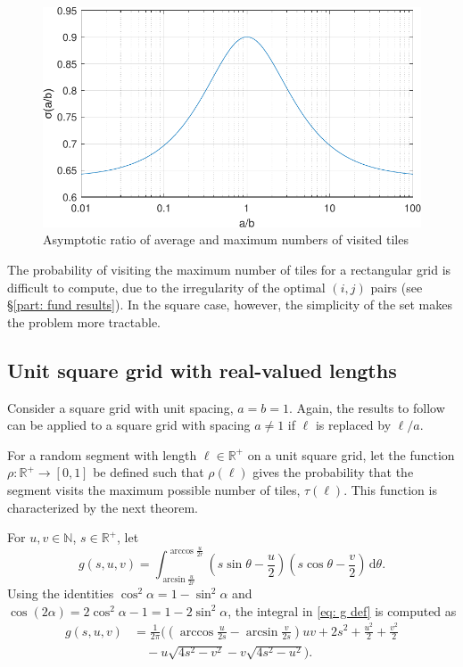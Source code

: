 \documentclass[12pt, a4paper]{article}
\newcommand{\diff}{\,\mathrm d}
\newcommand{\funt}{\tau} %
\newcommand{\probmax}{\rho} %
\newcommand{\len}{\ell} %
\newcommand{\genvar}{s}
\begin{document}
\begin{figure}
\centering%
\includegraphics[width=.7\textwidth]{ratio_asympt_slopes}%
\caption{Asymptotic ratio of average and maximum numbers of visited tiles
}%
\label{fig: ratio asympt slopes}%
\end{figure}%

The probability of visiting the maximum number of tiles for a rectangular grid is difficult to compute, due to the irregularity of the optimal $(i,j)$ pairs (see \S\ref{part: fund results}). In the square case, however, the simplicity of the set makes the problem more tractable. 


\subsection{Unit square grid with real-valued lengths}
\label{part: probmax: unit square grid, real lengths}

Consider a square grid with unit spacing, $a=b=1$. Again, the results to follow can be applied to a square grid with spacing $a \neq 1$ if $\len$ is replaced by $\len/a$.

For a random segment with length $\len \in \mathbb R^+$ on a unit square grid, let the function $\probmax: \mathbb R^+ \to [0,1]$ be defined such that $\probmax(\len)$ gives the probability that the segment visits the maximum possible number of tiles, $\funt(\len)$. This function is characterized by the next theorem.

For $u, v \in \mathbb N$, $\genvar \in \mathbb R^+$, let
\begin{equation}
\label{eq: g def}
g(\genvar, u, v) = \int_{\arcsin \frac u {2r}}^{\arccos \frac u {2r}} \left( \genvar \sin \theta - \frac u 2 \right) \left( \genvar \cos \theta - \frac v 2 \right) \diff \theta.
\end{equation}
Using the identities $\cos^2 \alpha = 1-\sin^2 \alpha$ and $\cos(2\alpha) = 2\cos^2\alpha-1 = 1 - 2\sin^2\alpha$, the integral in \eqref{eq: g def} is computed as
\begin{equation}
\label{eq: g fin}
\begin{split}
g(\genvar, u, v) &= \frac 1 {2\pi} \biggl(
\left(\arccos\frac{u}{2\genvar}-\arcsin\frac{v}{2\genvar}\right) u v + 2\genvar^2 + \frac{u^2} 2 + \frac{v^2} 2 \\
& \quad  - u \sqrt{4\genvar^2-v^2} - v \sqrt{4\genvar^2-u^2} \biggr).
\end{split}
\end{equation}
\end{document}
